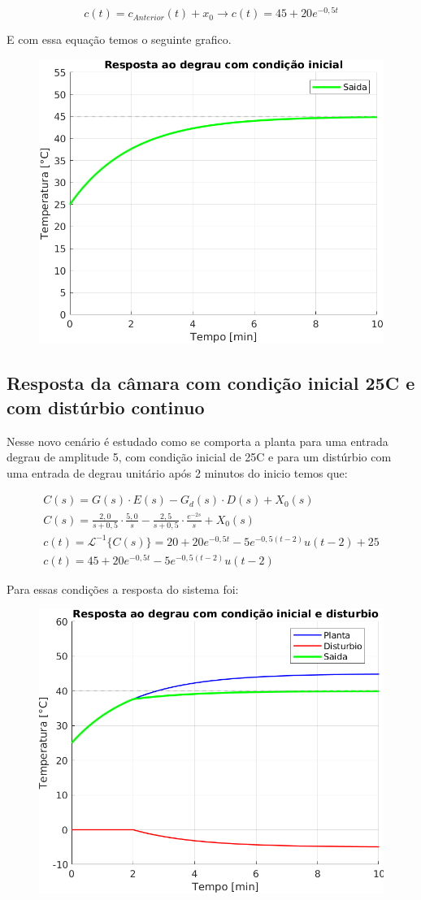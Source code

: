\documentclass[a4paper,12pt]{article}
\begin{document}
		\begin{equation}
			c(t) = c_{Anterior}(t) + x_0 \rightarrow c(t) = 45 + 20e^{-0,5t}
		\end{equation}
	
		E com essa equação temos o seguinte grafico.
		
		\begin{figure}[H]
			\centering
			\includegraphics[width=0.5\linewidth]{images/respc.png}
			\label{fig:resposta_c}
		\end{figure}
	
	\subsection{Resposta da câmara com condição inicial 25\degree C e com distúrbio continuo}
		Nesse novo cenário é estudado como se comporta a planta para uma entrada degrau de amplitude 5, com condição inicial de 25\degree C e para um distúrbio com uma entrada de degrau unitário após 2 minutos do inicio temos que:
		
		\begin{gather}
			C(s) = G(s) \cdot E(s) - G_d(s) \cdot D(s)  + X_0(s)\\[20pt]
			C(s) = \frac{2,0}{s+0,5} \cdot \frac{5,0}{s} - \frac{2,5}{s+0,5} \cdot \frac{e^{-2s}}{s} + X_0(s) \\[20pt]
			c(t) = \mathcal{L}^{-1} \{ C(s) \} = 20 + 20e^{-0,5t} - 5e^{-0,5(t-2)}u(t-2) + 25 \\[20pt]
			c(t) = 45 + 20e^{-0,5t} - 5e^{-0,5(t-2)}u(t-2)
		\end{gather}
	
		Para essas condições a resposta do sistema foi:
		
		\begin{figure}[H]
			\centering
			\includegraphics[width=0.5\linewidth]{images/respd.png}
			\label{fig:resposta_d}
		\end{figure}
	
\end{document}
